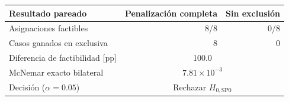 \begin{tabular}{lrr}
\toprule
Resultado pareado & Penalización completa & Sin exclusión \\
\midrule
Asignaciones factibles & 8/8 & 0/8 \\
Casos ganados en exclusiva & 8 & 0 \\
Diferencia de factibilidad [pp] & \multicolumn{2}{c}{100.0} \\
McNemar exacto bilateral & \multicolumn{2}{c}{$7.81\times10^{-3}$} \\
Decisión ($\alpha=0.05$) & \multicolumn{2}{c}{Rechazar $H_{0,\mathrm{SP0}}$} \\
\bottomrule
\end{tabular}

